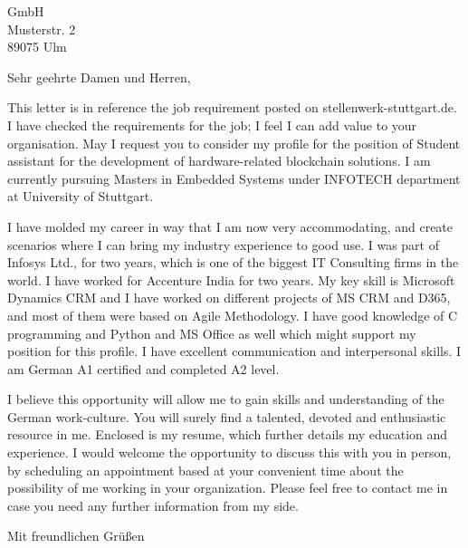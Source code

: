 \documentclass[DIN, pagenumber=false, parskip=half,%
               fromalign=right, 
               fromrule=false]{scrlttr2}
\begin{document}
 
\begin{letter}{ GmbH \\ Musterstr. 2 \\ 89075 Ulm}


\opening{Sehr geehrte Damen und Herren,}

This letter is in reference the job requirement posted on stellenwerk-stuttgart.de. I have checked the requirements for the job; I feel I can add value to your organisation. May I request you to consider my profile for the position of Student assistant for the development of hardware-related blockchain solutions. I am currently pursuing Masters in Embedded Systems under INFOTECH department at University of Stuttgart. 

I have molded my career in way that I am now very accommodating, and create scenarios where I can bring my industry experience to good use. I was part of Infosys Ltd., for two years, which is one of the biggest IT Consulting firms in the world. I have worked for Accenture India for two years. My key skill is Microsoft Dynamics CRM and I have worked on different projects of MS CRM and D365, and most of them were based on Agile Methodology. I have good knowledge of C programming and Python and MS Office as well which might support my position for this profile. I have excellent communication and interpersonal skills. I am German A1 certified and completed A2 level. 

I believe this opportunity will allow me to gain skills and understanding of the German work-culture. You will surely find a talented, devoted and enthusiastic resource in me. 
Enclosed is my resume, which further details my education and experience. I would welcome the opportunity to discuss this with you in person, by scheduling an appointment based at your convenient time about the possibility of me working in your organization. Please feel free to contact me in case you need any further information from my side. 


\closing{Mit freundlichen Grüßen}




\end{letter}
 
\end{document}

